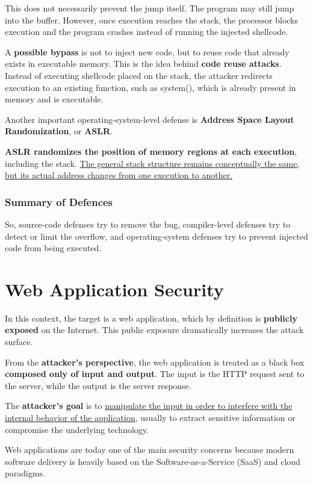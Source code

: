 \documentclass{article}
\begin{document}
This does not necessarily prevent the jump itself. The program may still jump into the buffer. However, once execution reaches the stack, the processor blocks execution and the program crashes instead of running the injected shellcode.

A \textbf{possible bypass} is not to inject new code, but to reuse code that already exists in executable memory. This is the idea behind \textbf{code reuse attacks}. Instead of executing shellcode placed on the stack, the attacker redirects execution to an existing function, such as system(), which is already present in memory and is executable.

Another important operating-system-level defense is \textbf{Address Space Layout Randomization}, or \textbf{ASLR}.

\textbf{ASLR randomizes the position of memory regions at each execution}, including the stack. \underline{The general stack structure remains conceptually the same, but its actual address changes from one execution to another.}

\subsubsection{Summary of Defences}

So, source-code defenses try to remove the bug, compiler-level defenses try to detect or limit the overflow, and operating-system defenses try to prevent injected code from being executed.

\section{Web Application Security}

In this context, the target is a web application, which by definition is \textbf{publicly exposed} on the Internet. This public exposure dramatically increases the attack surface.

From the \textbf{attacker's perspective}, the web application is treated as a black box \textbf{composed only of input and output}. The input is the HTTP request sent to the server, while the output is the server response.

The \textbf{attacker's goal} is to \underline{manipulate the input in order to interfere with the internal behavior of the application}, usually to extract sensitive information or compromise the underlying technology.

Web applications are today one of the main security concerns because modern software delivery is heavily based on the Software-as-a-Service (SaaS) and cloud paradigms.
\end{document}
